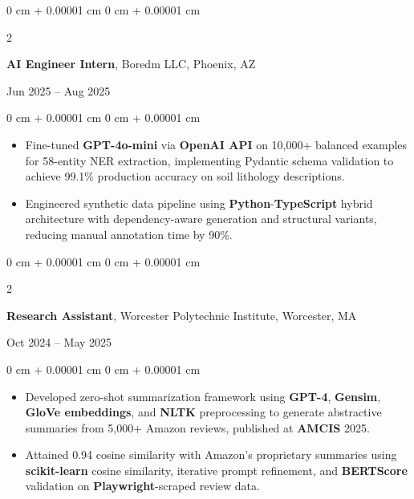 \documentclass[9pt, letterpaper]{extarticle}
\newenvironment{highlights}{
    \linespread{1.05}\selectfont
    \begin{itemize}[
        topsep=0.02 cm,
        parsep=0.02 cm,
        partopsep=0pt,
        itemsep=0.5pt,
        leftmargin=0.5em + 10pt
    ]
}{
    \end{itemize}
} %
\newenvironment{onecolentry}{
    \begin{adjustwidth}{
        0 cm + 0.00001 cm
    }{
        0 cm + 0.00001 cm
    }
}{
    \end{adjustwidth}
} %
\newenvironment{twocolentry}[2][]{
    \onecolentry
    \def\secondColumn{#2}
    \setcolumnwidth{\fill, 4.5 cm}
    \begin{paracol}{2}
}{
    \switchcolumn \raggedleft \secondColumn
    \end{paracol}
    \endonecolentry
} %
\begin{document}
        \vspace{0.13 cm}

        \begin{twocolentry}{
            Jun 2025 – Aug 2025
        }
            \textbf{AI Engineer Intern}, Boredm LLC, Phoenix, AZ
        \end{twocolentry}

        \vspace{0.04 cm}
        \begin{onecolentry}
            \begin{highlights}
                \item Fine-tuned \textbf{GPT-4o-mini} via \textbf{OpenAI API} on 10,000+ balanced examples for 58-entity NER extraction, implementing Pydantic schema validation to achieve 99.1\% production accuracy on soil lithology descriptions.
                \item Engineered synthetic data pipeline using \textbf{Python}-\textbf{TypeScript} hybrid architecture with dependency-aware generation and structural variants, reducing manual annotation time by 90\%.
            \end{highlights}
        \end{onecolentry}

        \vspace{0.13 cm}

        \begin{twocolentry}{
            Oct 2024 – May 2025
        }
            \textbf{Research Assistant}, Worcester Polytechnic Institute, Worcester, MA
        \end{twocolentry}

        \vspace{0.04 cm}
        \begin{onecolentry}
            \begin{highlights}
                \item Developed zero-shot summarization framework using \textbf{GPT-4}, \textbf{Gensim}, \textbf{GloVe embeddings}, and \textbf{NLTK} preprocessing to generate abstractive summaries from 5,000+ Amazon reviews, published at \textbf{AMCIS} 2025.
                \item Attained 0.94 cosine similarity with Amazon's proprietary summaries using \textbf{scikit-learn} cosine similarity, iterative prompt refinement, and \textbf{BERTScore} validation on \textbf{Playwright}-scraped review data.
            \end{highlights}
        \end{onecolentry}
\end{document}
